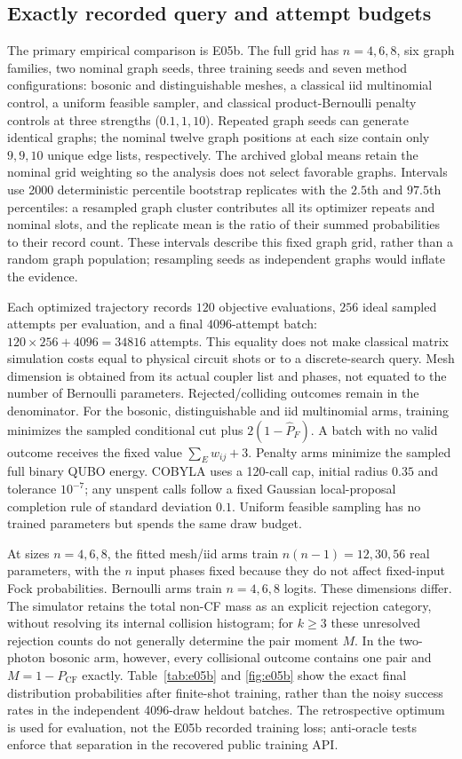 \documentclass[11pt,a4paper]{article}
\theoremstyle{remark}\newtheorem{remark}[theorem]{Remark}
\newcommand{\CF}{\mathrm{CF}}
\begin{document}
\subsection{Exactly recorded query and attempt budgets}
The primary empirical comparison is E05b. The full grid has $n=4,6,8$, six graph families, two nominal graph seeds, three training seeds and seven method configurations: bosonic and distinguishable meshes, a classical iid multinomial control, a uniform feasible sampler, and classical product-Bernoulli penalty controls at three strengths ($0.1,1,10$). Repeated graph seeds can generate identical graphs; the nominal twelve graph positions at each size contain only $9,9,10$ unique edge lists, respectively. The archived global means retain the nominal grid weighting so the analysis does not select favorable graphs. Intervals use 2000 deterministic percentile bootstrap replicates with the $2.5$th and $97.5$th percentiles: a resampled graph cluster contributes all its optimizer repeats and nominal slots, and the replicate mean is the ratio of their summed probabilities to their record count. These intervals describe this fixed graph grid, rather than a random graph population; resampling seeds as independent graphs would inflate the evidence.

Each optimized trajectory records $120$ objective evaluations, $256$ ideal sampled attempts per evaluation, and a final $4096$-attempt batch: $120\times256+4096=34816$ attempts. This equality does not make classical matrix simulation costs equal to physical circuit shots or to a discrete-search query. Mesh dimension is obtained from its actual coupler list and phases, not equated to the number of Bernoulli parameters. Rejected/colliding outcomes remain in the denominator. For the bosonic, distinguishable and iid multinomial arms, training minimizes the sampled conditional cut plus $2(1-\widehat P_F)$. A batch with no valid outcome receives the fixed value $\sum_E w_{ij}+3$. Penalty arms minimize the sampled full binary QUBO energy. COBYLA uses a 120-call cap, initial radius $0.35$ and tolerance $10^{-7}$; any unspent calls follow a fixed Gaussian local-proposal completion rule of standard deviation $0.1$. Uniform feasible sampling has no trained parameters but spends the same draw budget.

At sizes $n=4,6,8$, the fitted mesh/iid arms train $n(n-1)=12,30,56$ real parameters, with the $n$ input phases fixed because they do not affect fixed-input Fock probabilities. Bernoulli arms train $n=4,6,8$ logits. These dimensions differ. The simulator retains the total non-CF mass as an explicit rejection category, without resolving its internal collision histogram; for $k\ge3$ these unresolved rejection counts do not generally determine the pair moment $M$. In the two-photon bosonic arm, however, every collisional outcome contains one pair and $M=1-P_{\CF}$ exactly. Table~\ref{tab:e05b} and \cref{fig:e05b} show the exact final distribution probabilities after finite-shot training, rather than the noisy success rates in the independent 4096-draw heldout batches. The retrospective optimum is used for evaluation, not the E05b recorded training loss; anti-oracle tests enforce that separation in the recovered public training API.
\end{document}

